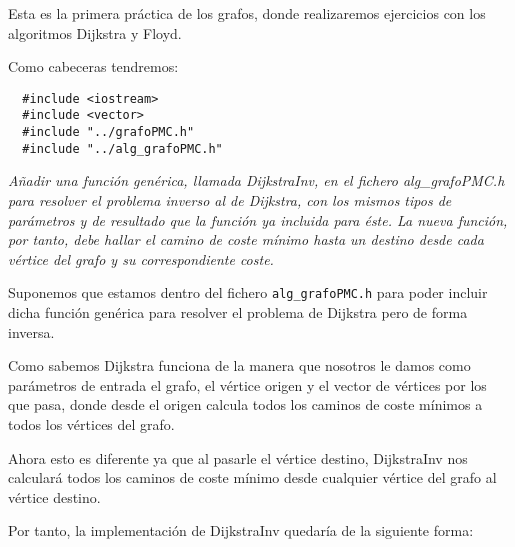 Esta es la primera práctica de los grafos, donde realizaremos ejercicios con los algoritmos Dijkstra y Floyd.

Como cabeceras tendremos:
\begin{verbatim}
  #include <iostream>
  #include <vector>
  #include "../grafoPMC.h"
  #include "../alg_grafoPMC.h"
\end{verbatim}

\textbf{\large{}}\textit{ Añadir una función genérica, llamada DijkstraInv, en el fichero alg\_grafoPMC.h para resolver el problema inverso al de Dijkstra, con los mismos tipos de parámetros y de resultado que la función ya incluida para éste. La nueva función, por tanto, debe hallar el camino de coste mínimo hasta un destino desde cada vértice del grafo y su correspondiente coste.}

Suponemos que estamos dentro del fichero \texttt{alg\_grafoPMC.h} para poder incluir dicha función genérica para resolver el problema de Dijkstra pero de forma inversa.

Como sabemos Dijkstra funciona de la manera que nosotros le damos como parámetros de entrada el grafo, el vértice origen y el vector de vértices por los que pasa, donde desde el origen calcula todos los caminos de coste mínimos a todos los vértices del grafo.

Ahora esto es diferente ya que al pasarle el vértice destino, DijkstraInv nos calculará todos los caminos de coste mínimo desde cualquier vértice del grafo al vértice destino.

Por tanto, la implementación de DijkstraInv quedaría de la siguiente forma:

